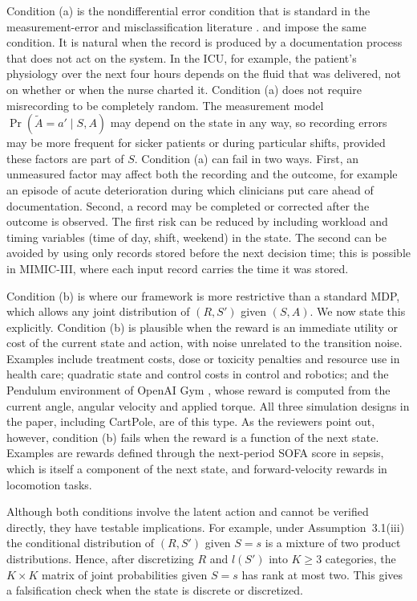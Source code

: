 \documentclass[12pt]{article}
\newcommand{\0}{\boldsymbol{0}}
\theoremstyle{definition}
\begin{document}
Condition (a) is the nondifferential error condition that is standard in the measurement-error and misclassification literature \citep[Chapter~2]{carroll2006measurement}. \citet{hu2008identification} and \citet{zhou2024causal} impose the same condition. It is natural when the record is produced by a documentation process that does not act on the system. In the ICU, for example, the patient's physiology over the next four hours depends on the fluid that was delivered, not on whether or when the nurse charted it. Condition (a) does not require misrecording to be completely random. The measurement model $\Pr(\widetilde A=a'\mid S,A)$ may depend on the state in any way, so recording errors may be more frequent for sicker patients or during particular shifts, provided these factors are part of $S$. Condition (a) can fail in two ways. First, an unmeasured factor may affect both the recording and the outcome, for example an episode of acute deterioration during which clinicians put care ahead of documentation. Second, a record may be completed or corrected after the outcome is observed. The first risk can be reduced by including workload and timing variables (time of day, shift, weekend) in the state. The second can be avoided by using only records stored before the next decision time; this is possible in MIMIC-III, where each input record carries the time it was stored.

Condition (b) is where our framework is more restrictive than a standard MDP, which allows any joint distribution of $(R,S')$ given $(S,A)$. We now state this explicitly. Condition (b) is plausible when the reward is an immediate utility or cost of the current state and action, with noise unrelated to the transition noise. Examples include treatment costs, dose or toxicity penalties and resource use in health care; quadratic state and control costs in control and robotics; and the Pendulum environment of OpenAI Gym \citep{brockman2016openai}, whose reward is computed from the current angle, angular velocity and applied torque. All three simulation designs in the paper, including CartPole, are of this type. As the reviewers point out, however, condition (b) fails when the reward is a function of the next state. Examples are rewards defined through the next-period SOFA score in sepsis, which is itself a component of the next state, and forward-velocity rewards in locomotion tasks.

Although both conditions involve the latent action and cannot be verified directly, they have testable implications. For example, under Assumption~3.1(iii) the conditional distribution of $(R,S')$ given $S=s$ is a mixture of two product distributions. Hence, after discretizing $R$ and $l(S')$ into $K\ge 3$ categories, the $K\times K$ matrix of joint probabilities given $S=s$ has rank at most two. This gives a falsification check when the state is discrete or discretized.
\end{document}
